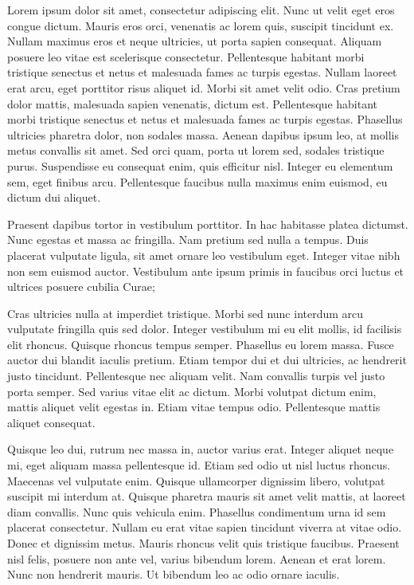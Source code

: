 \documentclass{article}
\begin{document}
Lorem ipsum dolor sit amet, consectetur adipiscing elit. Nunc ut velit eget eros congue dictum. Mauris eros orci, venenatis ac lorem quis, suscipit tincidunt ex. Nullam maximus eros et neque ultricies, ut porta sapien consequat. Aliquam posuere leo vitae est scelerisque consectetur. Pellentesque habitant morbi tristique senectus et netus et malesuada fames ac turpis egestas. Nullam laoreet erat arcu, eget porttitor risus aliquet id. Morbi sit amet velit odio. Cras pretium dolor mattis, malesuada sapien venenatis, dictum est. Pellentesque habitant morbi tristique senectus et netus et malesuada fames ac turpis egestas. Phasellus ultricies pharetra dolor, non sodales massa. Aenean dapibus ipsum leo, at mollis metus convallis sit amet. Sed orci quam, porta ut lorem sed, sodales tristique purus. Suspendisse eu consequat enim, quis efficitur nisl. Integer eu elementum sem, eget finibus arcu. Pellentesque faucibus nulla maximus enim euismod, eu dictum dui aliquet.

Praesent dapibus tortor in vestibulum porttitor. In hac habitasse platea dictumst. Nunc egestas et massa ac fringilla. Nam pretium sed nulla a tempus. Duis placerat vulputate ligula, sit amet ornare leo vestibulum eget. Integer vitae nibh non sem euismod auctor. Vestibulum ante ipsum primis in faucibus orci luctus et ultrices posuere cubilia Curae;

Cras ultricies nulla at imperdiet tristique. Morbi sed nunc interdum arcu vulputate fringilla quis sed dolor. Integer vestibulum mi eu elit mollis, id facilisis elit rhoncus. Quisque rhoncus tempus semper. Phasellus eu lorem massa. Fusce auctor dui blandit iaculis pretium. Etiam tempor dui et dui ultricies, ac hendrerit justo tincidunt. Pellentesque nec aliquam velit. Nam convallis turpis vel justo porta semper. Sed varius vitae elit ac dictum. Morbi volutpat dictum enim, mattis aliquet velit egestas in. Etiam vitae tempus odio. Pellentesque mattis aliquet consequat.

Quisque leo dui, rutrum nec massa in, auctor varius erat. Integer aliquet neque mi, eget aliquam massa pellentesque id. Etiam sed odio ut nisl luctus rhoncus. Maecenas vel vulputate enim. Quisque ullamcorper dignissim libero, volutpat suscipit mi interdum at. Quisque pharetra mauris sit amet velit mattis, at laoreet diam convallis. Nunc quis vehicula enim. Phasellus condimentum urna id sem placerat consectetur. Nullam eu erat vitae sapien tincidunt viverra at vitae odio. Donec et dignissim metus. Mauris rhoncus velit quis tristique faucibus. Praesent nisl felis, posuere non ante vel, varius bibendum lorem. Aenean et erat lorem. Nunc non hendrerit mauris. Ut bibendum leo ac odio ornare iaculis.
\end{document}
